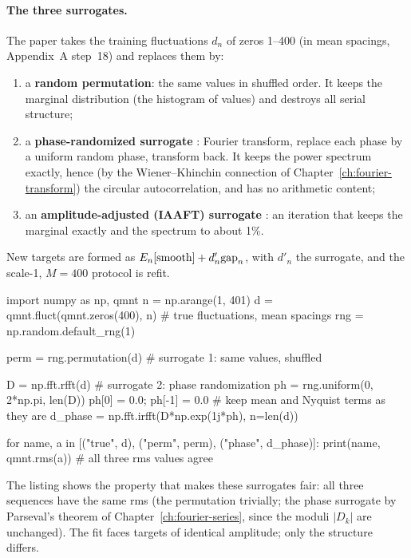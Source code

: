 \paragraph{The three surrogates.} The paper takes the training fluctuations $d_n$ of zeros 1--400 (in mean spacings, Appendix~A step~18) and replaces them by:
\begin{enumerate}
\item a \textbf{random permutation}: the same values in shuffled order. It keeps the marginal distribution (the histogram of values) and destroys all serial structure;
\item a \textbf{phase-randomized surrogate} \cite{theiler}: Fourier transform, replace each phase by a uniform random phase, transform back. It keeps the power spectrum exactly, hence (by the Wiener--Khinchin connection of Chapter~\ref{ch:fourier-transform}) the circular autocorrelation, and has no arithmetic content;
\item an \textbf{amplitude-adjusted (IAAFT) surrogate} \cite{schreiber}: an iteration that keeps the marginal exactly and the spectrum to about 1\%.
\end{enumerate}
New targets are formed as $E_n[\text{smooth}]+d'_n\mathrm{gap}_n$, with $d'_n$ the surrogate, and the scale-1, $M=400$ protocol is refit.

\begin{pycode}
import numpy as np, qmnt
n = np.arange(1, 401)
d = qmnt.fluct(qmnt.zeros(400), n)        # true fluctuations, mean spacings
rng = np.random.default_rng(1)

perm = rng.permutation(d)                 # surrogate 1: same values, shuffled

D = np.fft.rfft(d)                        # surrogate 2: phase randomization
ph = rng.uniform(0, 2*np.pi, len(D))
ph[0] = 0.0; ph[-1] = 0.0                 # keep mean and Nyquist terms as they are
d_phase = np.fft.irfft(D*np.exp(1j*ph), n=len(d))

for name, a in [("true", d), ("perm", perm), ("phase", d_phase)]:
    print(name, qmnt.rms(a))              # all three rms values agree
\end{pycode}

The listing shows the property that makes these surrogates fair: all three sequences have the same rms (the permutation trivially; the phase surrogate by Parseval's theorem of Chapter~\ref{ch:fourier-series}, since the moduli $|D_k|$ are unchanged). The fit faces targets of identical amplitude; only the structure differs.

